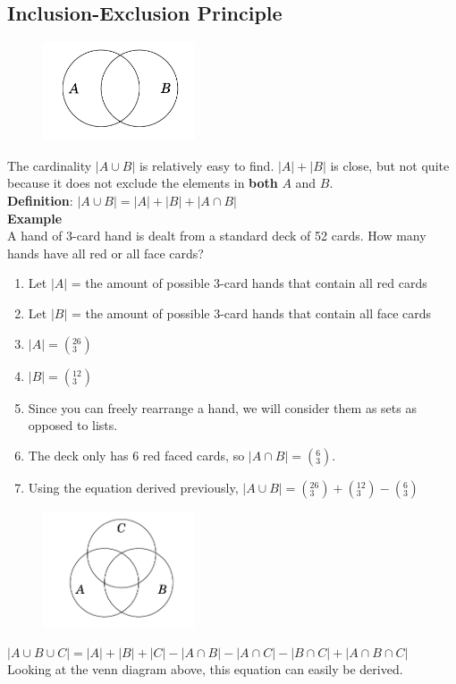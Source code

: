 \documentclass[a4paper,11pt]{article}
\begin{document}
\subsection{Inclusion-Exclusion Principle}
\begin{figure}[h]
 \centering
 \includegraphics[width=0.40\textwidth]{venn.png}
\end{figure}
The cardinality $|A \cup B|$ is relatively easy to find. $|A|+|B|$ is close, but not quite because it does not exclude the elements in \textbf{both} $A$ and $B$.\\
\textbf{Definition}: $|A \cup B|=|A|+|B|+|A \cap B|$\vspace{5pt}\\
\textbf{Example}\\
A hand of 3-card hand is dealt from a standard deck of 52 cards. How many hands have all red or all face cards?
\begin{enumerate}
 \item Let $|A|$ = the amount of possible 3-card hands that contain all red cards
 \item Let $|B|$ = the amount of possible 3-card hands that contain all face cards
 \item $|A|=(^{26}_3)$
 \item $|B|=(^{12}_3)$
 \item Since you can freely rearrange a hand, we will consider them as sets as opposed to lists.
 \item The deck only has 6 red faced cards, so $|A \cap B|=(^{6}_3)$.
 \item Using the equation derived previously, $|A \cup B|=(^{26}_3) + (^{12}_3) - (^{6}_3)$
\end{enumerate}
\begin{figure}[h]
 \centering
 \includegraphics[width=0.40\textwidth]{trivenn.png}
\end{figure}
$|A \cup B \cup C|=|A|+|B|+|C|-|A \cap B|-|A \cap C| - |B \cap C| + |A \cap B \cap C|$\\
Looking at the venn diagram above, this equation can easily be derived.
\end{document}
